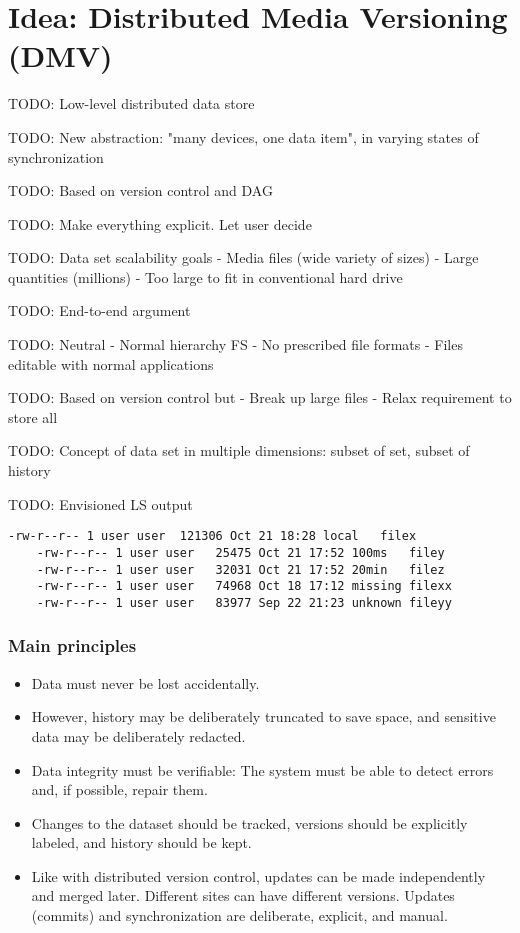 \chapter{Idea: Distributed Media Versioning (DMV)}

TODO: Low-level distributed data store

TODO: New abstraction: "many devices, one data item", in varying states of
synchronization

TODO: Based on version control and DAG

TODO: Make everything explicit. Let user decide

TODO: Data set scalability goals
    - Media files (wide variety of sizes)
    - Large quantities (millions)
    - Too large to fit in conventional hard drive

TODO: End-to-end argument

TODO: Neutral
    - Normal hierarchy FS
    - No prescribed file formats
    - Files editable with normal applications

TODO: Based on version control but
    - Break up large files
    - Relax requirement to store all

TODO: Concept of data set in multiple dimensions: subset of set, subset of
history


TODO: Envisioned LS output

\begin{lstlisting}[caption=Example ls output]
    -rw-r--r-- 1 user user  121306 Oct 21 18:28 local   filex
    -rw-r--r-- 1 user user   25475 Oct 21 17:52 100ms   filey
    -rw-r--r-- 1 user user   32031 Oct 21 17:52 20min   filez
    -rw-r--r-- 1 user user   74968 Oct 18 17:12 missing filexx
    -rw-r--r-- 1 user user   83977 Sep 22 21:23 unknown fileyy
\end{lstlisting}



\subsection{Main principles}

\begin{itemize}

  \item Data must never be lost accidentally.

  \item However, history may be deliberately truncated to save space, and
    sensitive data may be deliberately redacted.

  \item Data integrity must be verifiable: The system must be able to detect
    errors and, if possible, repair them.

  \item Changes to the dataset should be tracked, versions should be explicitly
    labeled, and history should be kept.

  \item Like with distributed version control, updates can be made independently
    and merged later. Different sites can have different versions. Updates
    (commits) and synchronization are deliberate, explicit, and manual.

\end{itemize}


